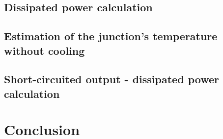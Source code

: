 \subsection{Dissipated power calculation} \label{ssec:num14}
{}
\subsection{Estimation of the junction's temperature without cooling} \label{ssec:num15}
{}
\subsection{Short-circuited output - dissipated power calculation} \label{ssec:num16}
{}

\section{Conclusion}
{}

\clearpage